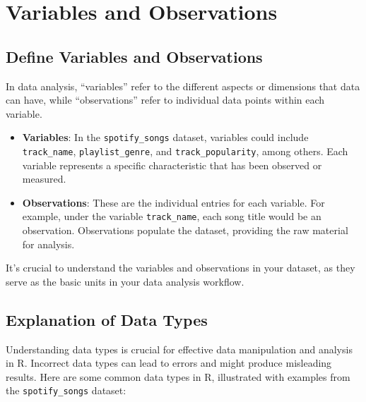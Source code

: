 \documentclass[
  b5paper]{book}
\begin{document}
\hypertarget{variables-and-observations}{%
\section{Variables and Observations}\label{variables-and-observations}}

\hypertarget{define-variables-and-observations}{%
\subsection*{Define Variables and Observations}\label{define-variables-and-observations}}

In data analysis, ``variables'' refer to the different aspects or dimensions that data can have, while ``observations'' refer to individual data points within each variable.

\begin{itemize}
\item
  \textbf{Variables}: In the \texttt{spotify\_songs} dataset, variables could include \texttt{track\_name}, \texttt{playlist\_genre}, and \texttt{track\_popularity}, among others. Each variable represents a specific characteristic that has been observed or measured.
\item
  \textbf{Observations}: These are the individual entries for each variable. For example, under the variable \texttt{track\_name}, each song title would be an observation. Observations populate the dataset, providing the raw material for analysis.
\end{itemize}

It's crucial to understand the variables and observations in your dataset, as they serve as the basic units in your data analysis workflow.

\hypertarget{explanation-of-data-types}{%
\subsection*{Explanation of Data Types}\label{explanation-of-data-types}}

Understanding data types is crucial for effective data manipulation and analysis in R. Incorrect data types can lead to errors and might produce misleading results. Here are some common data types in R, illustrated with examples from the \texttt{spotify\_songs} dataset:
\end{document}
